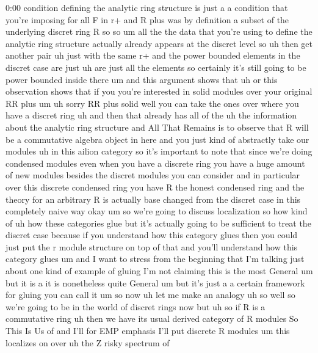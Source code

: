 \begin{unfinished}{0:00}
condition  defining  the  analytic  ring
structure  is  just  a  a  condition  that
you're  imposing  for  all  F  in  r+  and  R
plus  was  by  definition  a  subset  of  the
underlying  discret  ring
R  so
so  um  all  the  the  data  that  you're  using
to  define  the  analytic  ring  structure
actually  already  appears  at  the  discret
level  so  uh  then  get  another
pair
uh  just  with  the  same  r+  and  the  power
bounded  elements  in  the  discret  case  are
just  uh  are  just  all  the  elements  so
certainly  it's  still  going  to  be  power
bounded  inside  there  um  and  this
argument  shows  that  uh  or  this
observation  shows  that  if  you  you're
interested  in  solid  modules  over  your
original  RR  plus  um  uh  sorry  RR  plus
solid  well  you  can  take  the  ones  over
where  you  have  a  discret
ring
uh  and  then  that  already  has  all  of  the
uh  the  information  about  the  analytic
ring  structure  and  All  That  Remains  is
to  observe  that
R  will  be  a  commutative  algebra  object
in  here  and  you  just  kind  of  abstractly
take  our  modules  uh  in  this  ailion
category  so  it's  important  to  note  that
since  we're  doing  condensed  modules  even
when  you  have  a  discrete  ring  you  have  a
huge  amount  of  new  modules  besides  the
discret  modules  you  can  consider  and  in
particular  over  this  discrete  condensed
ring  you  have  R  the  honest  condensed
ring  and  the  theory  for  an  arbitrary  R
is  actually  base  changed  from  the
discret  case  in  this  completely  naive
way
okay  um
so  we're  going  to  discuss  localization
so  how  kind  of  uh  how  these  categories
glue  but  it's  actually  going  to  be
sufficient  to  treat  the  discret  case
because  if  you  understand  how  this
category  glues  then  you  could  just  put
the  r  module  structure  on  top  of  that
and  you'll  understand  how  this  category
glues  um  and  I  want  to  stress  from  the
beginning  that  I'm  talking  just  about
one  kind  of  example  of  gluing  I'm  not
claiming  this  is  the  most  General  um  but
it  is  a  it  is  nonetheless  quite  General
um  but  it's  just  a  a  certain  framework
for  gluing  you  can  call  it
um  so  now  uh  let  me  make  an  analogy
uh  so  well  so  we're  going  to  be  in  the
world  of  discret  rings  now  but  uh  so  if
R  is  a  commutative
ring  uh  then  we  have  its  usual  derived
category  of  R  modules  So  This  Is
Us
of  and  I'll  for  EMP  emphasis  I'll  put
discrete  R
modules  um  this  localizes
on  over  uh  the  Z  risky  spectrum  of

\end{unfinished}
